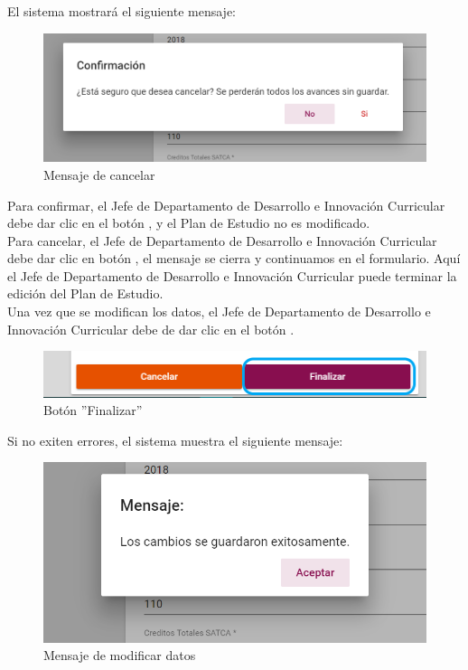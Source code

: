 El sistema mostrará el siguiente mensaje:
\begin{figure}[!hbtp]
	\centering
	\hypertarget{ms1}{\includegraphics[width=0.7\linewidth]{images/SP4-GPE/m1}}
	\caption{Mensaje de cancelar}
	\label{ms1}
\end{figure}

Para confirmar, el Jefe de Departamento de Desarrollo e Innovación Curricular debe dar clic en el botón  , y el Plan de Estudio no es modificado.\\

Para cancelar, el Jefe de Departamento de Desarrollo e Innovación Curricular debe dar clic en botón  , el mensaje se cierra y continuamos en el formulario. Aquí el Jefe de Departamento de Desarrollo e Innovación Curricular puede terminar la edición del Plan de Estudio.\\

Una vez que se modifican los datos,  el Jefe de Departamento de Desarrollo e Innovación Curricular debe de dar clic en el botón  .
\begin{figure}[!hbtp]
	\centering
	\hypertarget{btnfin}{\includegraphics[width=0.7\linewidth]{images/SP4-GPE/editarPER}}
	\caption{Botón ''Finalizar''}
	\label{btnfin}
\end{figure}

Si no exiten errores, el sistema muestra el siguiente mensaje:
\begin{figure}[!hbtp]
	\centering
	\hypertarget{ms2}{\includegraphics[width=0.7\linewidth]{images/SP4-GPE/m2}}
	\caption{Mensaje de modificar datos}
	\label{ms2}
\end{figure}


